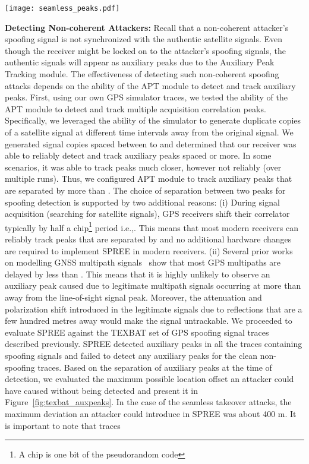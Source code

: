 \documentclass[letterpaper,twocolumn,10pt]{article}
\newcommand{\ie}{i.e.,\xspace}
\newcommand{\rxname}{SPREE\xspace}
\begin{document}
\begin{figure*}[t]
  \centering
  \texttt{[image: seamless\_peaks.pdf]}
  \caption{Detecting seamless take over attack. As the attacker begins to drift the spoofing signal away with the intention of changing the course of the ship, SPREE will detect the auxiliary peak produced by the legitimate satellite signal and rise an alarm.}
  \label{fig:seamless-takeover-detection}
\end{figure*}
\noindent\textbf{Detecting Non-coherent Attackers:} Recall that a non-coherent attacker's spoofing signal is not synchronized with the authentic satellite signals. Even though the receiver might be locked on to the attacker's spoofing signals, the authentic signals will appear as auxiliary peaks due to the Auxiliary Peak Tracking module. The effectiveness of detecting such non-coherent spoofing attacks depends on the ability of the APT module to detect and track auxiliary peaks. First, using our own GPS simulator traces, we tested the ability of the APT module to detect and track multiple acquisition correlation peaks. Specifically, we leveraged the ability of the simulator to generate duplicate copies of a satellite signal at different time intervals away from the original signal. We generated signal copies spaced between  to  and determined that our receiver was able to reliably detect and track auxiliary peaks spaced  or more. In some scenarios, it was able to track peaks much closer, however not reliably (over multiple runs). Thus, we configured APT module to track auxiliary peaks that are separated by more than . The choice of  separation between two peaks for spoofing detection is supported by two additional reasons: (i) During signal acquisition (searching for satellite signals), GPS receivers shift their correlator typically by half a chip\footnote{A chip is one bit of the pseudorandom code} period \ie . This means that most modern receivers can reliably track peaks that are separated by  and no additional hardware changes are required to implement \rxname in modern receivers. (ii) Several prior works on modelling GNSS multipath signals~\cite{kong2011statistical,Braasch2001,lehner2005land,manandhar2006gps} show that most GPS multipaths are delayed by less than . This means that it is highly unlikely to observe an auxiliary peak caused due to legitimate multipath signals occurring at more than  away from the line-of-sight signal peak. Moreover, the attenuation and polarization shift introduced in the legitimate signals due to reflections that are a few hundred metres away would make the signal untrackable. We proceeded to evaluate \rxname against the TEXBAT set of GPS spoofing signal traces described previously. \rxname detected auxiliary peaks in all the traces containing spoofing signals and failed to detect any auxiliary peaks for the clean non-spoofing traces. Based on the separation of auxiliary peaks at the time of detection, we evaluated the maximum possible location offset an attacker could have caused without being detected and present it in Figure~\ref{fig:texbat_auxpeaks}. In the case of the seamless takeover attacks, the maximum deviation an attacker could introduce in \rxname was about 400 m. It is important to note that traces 
\end{document}
